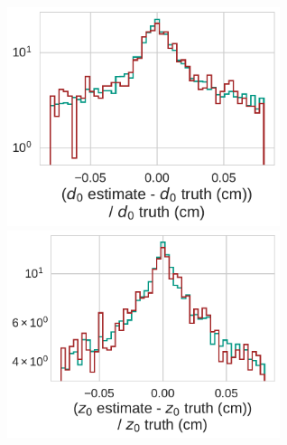 \documentclass[18pt, aspectratio=169]{beamer}
\begin{document}
\begin{frame}
\begin{columns}
    \begin{column}{.5\textwidth}
      \centering
      \includegraphics[width=0.6\textwidth]{figures/d0_resolution_on_matched_fullreco_trainedWithFakes.pdf}\\
      \includegraphics[width=0.6\textwidth]{figures/z0_resolution_on_matched_fullreco_trainedWithFakes.pdf}
    \end{column}
  \end{columns}
  
\end{frame}
\end{document}
